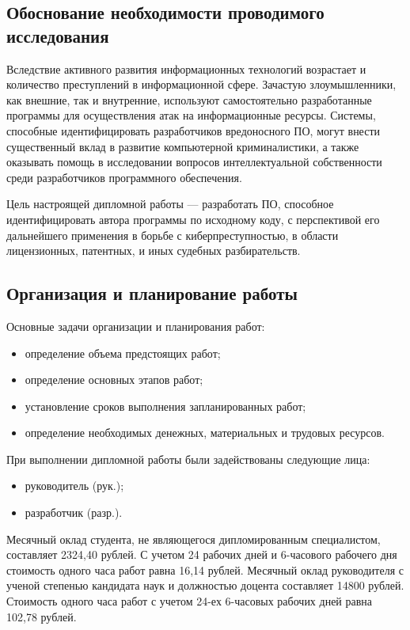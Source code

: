 \subsection{Обоснование необходимости проводимого исследования}

Вследствие активного развития информационных технологий возрастает и количество преступлений в информационной сфере.
Зачастую злоумышленники, как внешние, так и внутренние, используют самостоятельно разработанные программы для осуществления 
атак на информационные ресурсы.
Системы, способные идентифицировать разработчиков вредоносного ПО, могут внести существенный вклад в развитие компьютерной
криминалистики, а также оказывать помощь в исследовании вопросов интеллектуальной собственности среди разработчиков программного
обеспечения.

Цель настроящей дипломной работы --- разработать ПО, способное идентифицировать автора программы по исходному коду, с перспективой его
дальнейшего применения в борьбе с киберпреступностью, в области лицензионных, патентных, и иных судебных разбирательств.


\subsection{Организация и планирование работы}

Основные задачи организации и планирования работ:
\begin{itemize}
 \item определение объема предстоящих работ;
 \item определение основных этапов работ;
 \item установление сроков выполнения запланированных работ;
 \item определение необходимых денежных, материальных и трудовых ресурсов.
\end{itemize}


При выполнении дипломной работы были задействованы следующие лица:
\begin{itemize}
 \item руководитель (рук.);
 \item разработчик (разр.).
\end{itemize}

Месячный оклад студента, не являющегося дипломированным специалистом, составляет 2324,40 рублей.
С учетом 24 рабочих дней и 6-часового рабочего дня стоимость одного часа работ равна 16,14 рублей.
Месячный оклад руководителя с ученой степенью кандидата наук и должностью доцента составляет 14800 рублей.
Стоимость одного часа работ с учетом 24-ех 6-часовых рабочих дней равна 102,78 рублей.   

